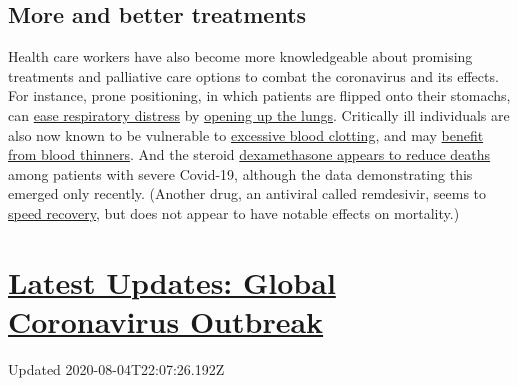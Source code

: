 \hypertarget{more-and-better-treatments}{%
\subsection{More and better
treatments}\label{more-and-better-treatments}}

Health care workers have also become more knowledgeable about promising
treatments and palliative care options to combat the coronavirus and its
effects. For instance, prone positioning, in which patients are flipped
onto their stomachs, can
\href{https://jamanetwork.com/journals/jamainternalmedicine/fullarticle/2767575}{ease
respiratory distress} by
\href{https://www.nytimes3xbfgragh.onion/2020/05/13/health/coronavirus-proning-lungs.html}{opening
up the lungs}. Critically ill individuals are also now known to be
vulnerable to
\href{https://www.nytimes3xbfgragh.onion/2020/05/14/health/coronavirus-strokes.html}{excessive
blood clotting}, and may
\href{https://ashpublications.org/blood/article/135/23/2033/454646/COVID-19-and-its-implications-for-thrombosis-and}{benefit
from blood thinners}. And the steroid
\href{https://www.nytimes3xbfgragh.onion/2020/06/16/world/europe/dexamethasone-coronavirus-covid.html}{dexamethasone
appears to reduce deaths} among patients with severe Covid-19, although
the data demonstrating this emerged only recently. (Another drug, an
antiviral called remdesivir, seems to
\href{https://www.nytimes3xbfgragh.onion/2020/05/23/health/coronavirus-remdesivir.html}{speed
recovery}, but does not appear to have notable effects on mortality.)

\hypertarget{latest-updates-global-coronavirus-outbreak}{%
\section{\texorpdfstring{\href{https://www.nytimes3xbfgragh.onion/2020/08/04/world/coronavirus-cases.html?action=click\&pgtype=Article\&state=default\&region=MAIN_CONTENT_1\&context=storylines_live_updates}{Latest
Updates: Global Coronavirus
Outbreak}}{Latest Updates: Global Coronavirus Outbreak}}\label{latest-updates-global-coronavirus-outbreak}}

Updated 2020-08-04T22:07:26.192Z

